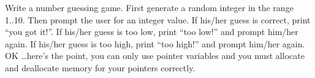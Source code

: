 Write a number guessing game. First generate a random integer in the range 1..10. Then prompt the user for an integer value. If his/her guess is correct, print ``you got it!''. If his/her guess is too low, print ``too low!'' and prompt him/her again. If his/her guess is too high, print ``too high!'' and prompt him/her again. OK \ldots here's the point, you can only use pointer variables and you must allocate and deallocate memory for your pointers correctly.

